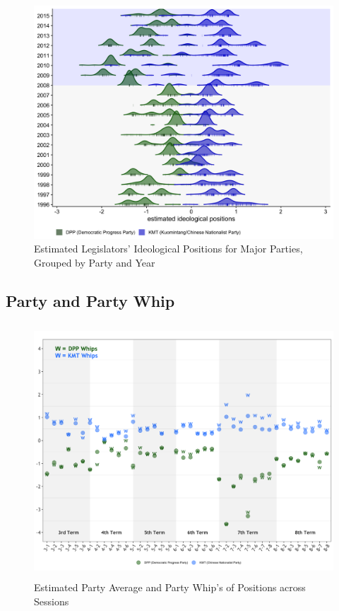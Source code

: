 \begin{figure}[ht]
\caption{Estimated Legislators' Ideological Positions for Major
Parties, Grouped by Party and Year \label{fig:year-plot}
}\centering{}\includegraphics[scale=0.15]{02-Chapter-Two/image/major_postions_year.png}
\end{figure}

\subsection*{Party and Party Whip}

\begin{figure}[ht]
    \centering{}\caption{\label{Fig:2-1}
    Estimated Party Average and Party Whip's of Positions across Sessions \label{fig:whip_mean}}
    \includegraphics[width=14cm,height=9.5cm]{02-Chapter-Two/image/partywhip_mean}
\end{figure}

